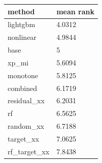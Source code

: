 \begin{tabular}{ll}
\toprule
method & mean rank \\
\midrule
lightgbm & 4.0312 \\
nonlinear & 4.9844 \\
base & 5 \\
xp\_mi & 5.6094 \\
monotone & 5.8125 \\
combined & 6.1719 \\
residual\_xx & 6.2031 \\
rf & 6.5625 \\
random\_xx & 6.7188 \\
target\_xx & 7.0625 \\
rf\_target\_xx & 7.8438 \\
\bottomrule
\end{tabular}
